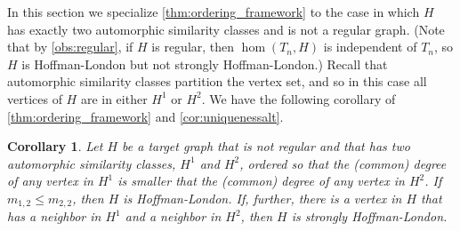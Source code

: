 \documentclass[11pt]{article}
\newtheorem{corollary}[theorem]{Corollary}
\theoremstyle{definition}
\begin{document}
In this section we specialize \cref{thm:ordering_framework} to the case in which $H$ has exactly two automorphic similarity classes and is not a regular graph. (Note that by \cref{obs:regular}, if $H$ is regular, then $\hom(T_n,H)$ is independent of $T_n$, so $H$ is Hoffman-London but not strongly Hoffman-London.) Recall that automorphic similarity classes partition the vertex set, and so in this case all vertices of $H$ are in either $H^1$ or $H^2$. We have the following corollary of \cref{thm:ordering_framework} and \cref{cor:uniquenessalt}. 
\begin{corollary} \label{cor:two-auto}
Let $H$ be a target graph that is not regular and that has two automorphic similarity classes, $H^1$ and $H^2$, ordered so that the (common) degree of any vertex in $H^1$ is smaller that the (common) degree of any vertex in $H^2$. If $m_{1,2} \le m_{2,2}$, then $H$ is Hoffman-London. If, further, there is a vertex in $H$ that has a neighbor in $H^1$ and a neighbor in $H^2$, then $H$ is strongly Hoffman-London.
\end{corollary}
\end{document}
